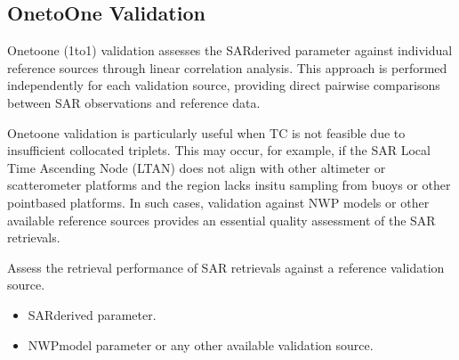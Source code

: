 \documentclass[a4paper,10pt,english]{sphinxmanual}
\begin{document}
\subsection{One\sphinxhyphen{}to\sphinxhyphen{}One Validation}
\label{\detokenize{alg-02-validation:one-to-one-validation}}
\sphinxAtStartPar
One\sphinxhyphen{}to\sphinxhyphen{}one (1\sphinxhyphen{}to\sphinxhyphen{}1) validation assesses the SAR\sphinxhyphen{}derived parameter against
individual reference sources through linear correlation analysis. This
approach is performed independently for each validation source, providing
direct pairwise comparisons between SAR observations and reference data.

\sphinxAtStartPar
One\sphinxhyphen{}to\sphinxhyphen{}one validation is particularly useful when TC is not feasible due to
insufficient collocated triplets. This may occur, for example, if the SAR
Local Time Ascending Node (LTAN) does not align with other altimeter or
scatterometer platforms and the region lacks in\sphinxhyphen{}situ sampling from buoys or
other point\sphinxhyphen{}based platforms. In such cases, validation against NWP models or
other available reference sources provides an essential quality assessment of
the SAR retrievals.

\sphinxAtStartPar
{}

\sphinxAtStartPar
Assess the retrieval performance of SAR retrievals against a reference
validation source.

\sphinxAtStartPar
{}
\begin{itemize}
\item {} 
\sphinxAtStartPar
SAR\sphinxhyphen{}derived parameter.

\item {} 
\sphinxAtStartPar
NWP\sphinxhyphen{}model parameter or any other available validation source.

\end{itemize}
\end{document}
